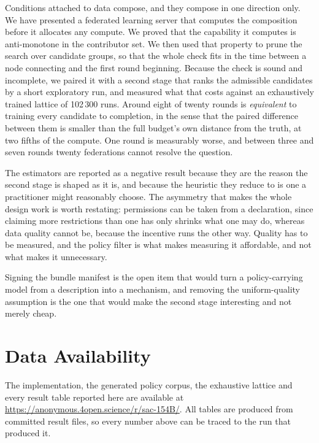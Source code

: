\documentclass[10pt,conference]{IEEEtran}
\newcommand{\repourl}{\url{https://anonymous.4open.science/r/sac-154B/}}
\begin{document}
Conditions attached to data compose, and they compose in one direction only. We have presented a federated learning server that computes the composition before it allocates any compute. We proved that the capability it computes is anti-monotone in the contributor set. We then used that property to prune the search over candidate groups, so that the whole check fits in the time between a node connecting and the first round beginning. Because the check is sound and incomplete, we paired it with a second
stage that ranks the admissible candidates by a short exploratory run, and
measured what that costs against an exhaustively trained lattice of 102\,300
runs. Around eight of twenty rounds is \emph{equivalent} to training every
candidate to completion, in the sense that the paired difference between them is
smaller than the full budget's own distance from the truth, at two fifths of the
compute. One round is measurably worse, and between three and seven rounds
twenty federations cannot resolve the question.

The estimators are reported as a negative result because they are the reason the
second stage is shaped as it is, and because the heuristic they reduce to is one
a practitioner might reasonably choose. The asymmetry that makes the whole
design work is worth restating: permissions can be taken from a declaration,
since claiming more restrictions than one has only shrinks what one may do,
whereas data quality cannot be, because the incentive runs the other way.
Quality has to be measured, and the policy filter is what makes measuring it affordable, and not what makes it unnecessary.

Signing the bundle manifest is the open item that would turn a policy-carrying
model from a description into a mechanism, and removing the uniform-quality
assumption is the one that would make the second stage interesting and not merely cheap.

\section*{Data Availability}

The implementation, the generated policy corpus, the exhaustive lattice and
every result table reported here are available at \repourl. All tables are
produced from committed result files, so every number above can be traced to
the run that produced it.



\end{document}

